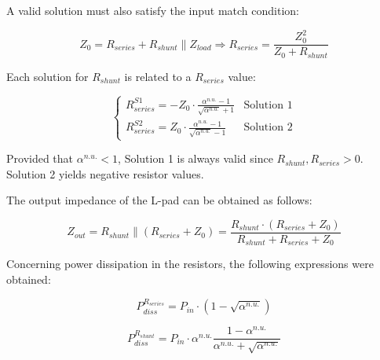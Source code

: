 \noindent A valid solution must also satisfy the input match condition:

\begin{equation}
	Z_0 = R_{series} + R_{shunt} \parallel Z_{load} \Rightarrow R_{series} = \frac{Z_0^2}{Z_0 + R_{shunt}}
\end{equation}

\noindent Each solution for $R_{shunt}$ is related to a $R_{series}$ value:

\begin{equation}
	\begin{cases}
		R_{series}^{S1} = -Z_0 \cdot \frac{\alpha^{n.u.} - 1}{\sqrt{\alpha^{n.u.}} + 1}  & \text{Solution 1} \\
		R_{series}^{S2} = Z_0 \cdot \frac{\alpha^{n.u.} - 1}{\sqrt{\alpha^{n.u.}} - 1} & \text{Solution 2}
	\end{cases}
\end{equation}

\noindent Provided that $\alpha^{n.u.} < 1$, Solution 1 is always valid since $R_{shunt}, R_{series} > 0$. Solution 2 yields negative resistor values.

\noindent The output impedance of the L-pad can be obtained as follows:

\begin{equation}
	Z_{out} = R_{shunt} \parallel \left( R_{series} + Z_0 \right) = \frac{R_{shunt} \cdot \left( R_{series} + Z_0 \right)}{R_{shunt} + R_{series} + Z_0}
\end{equation}

\noindent Concerning power dissipation in the resistors, the following expressions were obtained:

\begin{equation}
	P_{diss}^{R_{series}} = P_{in} \cdot \left( 1 - \sqrt{\alpha^{n.u.}} \right)
\end{equation}

\begin{equation}
	P_{diss}^{R_{shunt}} = P_{in} \cdot \alpha^{n.u.} \frac{1 - \alpha^{n.u.}}{\alpha^{n.u.} + \sqrt{\alpha^{n.u.}}}
\end{equation}